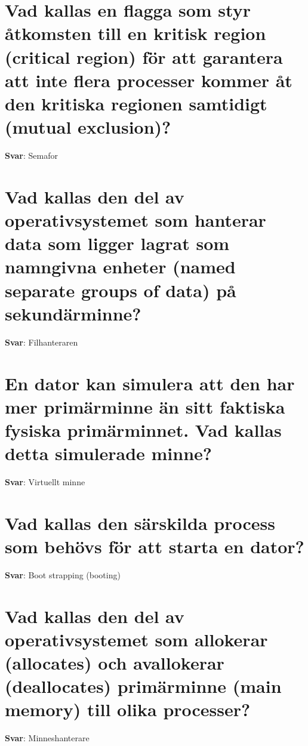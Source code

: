 \documentclass[a4paper,11pt,oneside]{book}
\begin{document}
\begin{sloppypar}
\section{Vad kallas en flagga som styr \r{a}tkomsten till en kritisk region (critical region) f\"or att garantera att inte flera processer kommer \r{a}t den kritiska regionen samtidigt (mutual exclusion)?}

\label{q:12:sa:sv:True}

\textbf{Svar}: Semafor



\section{Vad kallas den del av operativsystemet som hanterar data som ligger lagrat som namngivna enheter (named separate groups of data) p\r{a} sekund\"arminne?}

\label{q:13:sa:sv:True}

\textbf{Svar}: Filhanteraren



\section{En dator kan simulera att den har mer prim\"arminne \"an sitt faktiska fysiska prim\"arminnet. Vad kallas detta simulerade minne?}

\label{q:14:sa:sv:True}

\textbf{Svar}: Virtuellt minne



\section{Vad kallas den s\"arskilda process som beh\"ovs f\"or att starta en dator?}

\label{q:15:sa:sv:True}

\textbf{Svar}: Boot strapping (booting)



\section{Vad kallas den del av operativsystemet som allokerar (allocates) och avallokerar (deallocates) prim\"arminne (main memory) till olika processer?}

\label{q:16:sa:sv:True}

\textbf{Svar}: Minneshanterare




\end{sloppypar}
\end{document}
